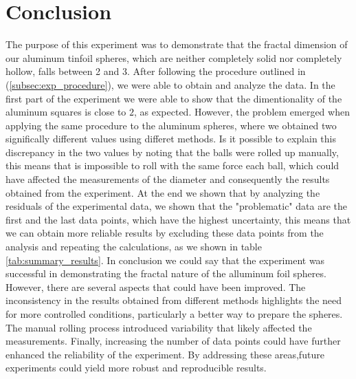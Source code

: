 \documentclass[a4paper,12pt]{article}
\begin{document}
\section{Conclusion}\label{sec:conclusion}
The purpose of this experiment was to demonstrate that the fractal dimension of our aluminum tinfoil spheres, 
which are neither completely solid nor completely hollow, falls between 2 and 3. 
After following the procedure outlined in (\ref{subsec:exp_procedure}), we were able to obtain and analyze the data.
In the first part of the experiment we were able to show that the dimentionality of the aluminum squares is close to $2$, as expected.
However, the problem emerged when applying the same procedure to the aluminum spheres, where we obtained two significally different values 
using differet methods. Is it possible to explain this discrepancy in the two values by noting that the balls were rolled up manually,
this means that is impossible to roll with the same force each ball, which could have affected the measurements of the diameter and consequently the results obtained from the experiment.
At the end we shown that by analyzing the residuals of the experimental data, we shown that the "problematic" data are the first and the last data points, which have the highest uncertainty,
this means that we can obtain more reliable results by excluding these data points from the analysis and repeating the calculations, as we shown in table \ref{tab:summary_results}.
In conclusion we could say that the experiment was successful in demonstrating the fractal nature of the alluminum foil spheres.
However, there are several aspects that could have been improved. The inconsistency in the results obtained from different methods highlights 
the need for more controlled conditions, particularly a better way to prepare the spheres. The manual rolling process introduced variability that likely affected the measurements. 
Finally, increasing the number of data points could have further enhanced the reliability of the experiment.
By addressing these areas,future experiments could yield more robust and reproducible results.

\newpage
\printbibliography
\end{document}
